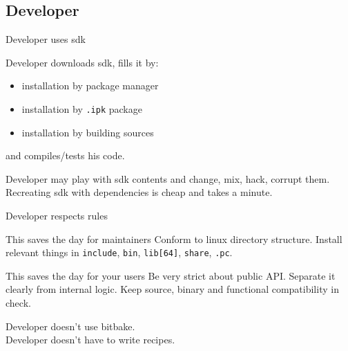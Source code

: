 \documentclass{beamer}
\begin{document}

\subsection{Developer}

\begin{frame}[fragile]{Developer uses sdk}
    \begin{block}{}
        Developer downloads sdk, fills it by:
        \begin{itemize}
            \item installation by package manager
            \item installation by \verb|.ipk| package
            \item installation by building sources
        \end{itemize}
        and compiles/tests his code.
    \end{block}
    \begin{block}{}
        \color{green!60!black}
        Developer may play with sdk contents and change, mix, hack, corrupt them.
        Recreating sdk with dependencies is cheap and takes a minute.
    \end{block}
\end{frame}

\begin{frame}[fragile]{Developer respects rules}
    \begin{block}{This saves the day for maintainers}
        Conform to linux directory structure.
        Install relevant things in \verb|include|, \verb|bin|,
        \verb|lib[64]|, \verb|share|, \verb|.pc|.
    \end{block}
    \begin{block}{This saves the day for your users}
        Be very strict about public API.
        Separate it clearly from internal logic.
        Keep source, binary and functional compatibility in check.
    \end{block}
    \begin{block}{}
        \color{red!60!black}
        Developer doesn't use bitbake. \\
        Developer doesn't have to write recipes.
    \end{block}
\end{frame}
\end{document}
